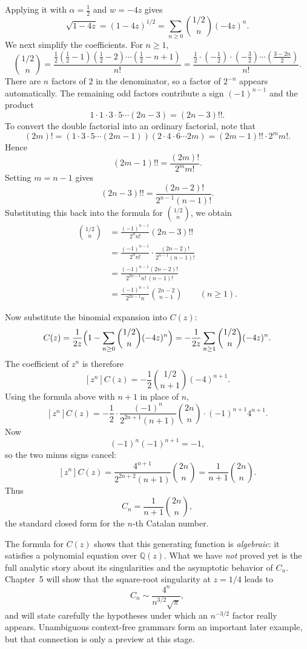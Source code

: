 Applying it with $\alpha=\tfrac12$ and $w=-4z$ gives
\[
  \sqrt{1-4z} = (1-4z)^{1/2} = \sum_{n \ge 0} \binom{1/2}{n}(-4z)^n.
\]
We next simplify the coefficients. For $n \ge 1$,
\[
  \binom{1/2}{n}
  = \frac{\tfrac12(\tfrac12-1)(\tfrac12-2)\cdots(\tfrac12-n+1)}{n!}
  = \frac{\tfrac12 \cdot (-\tfrac12)\cdot(-\tfrac32)\cdots(\tfrac{3-2n}{2})}{n!}.
\]
There are $n$ factors of $2$ in the denominator, so a factor of $2^{-n}$ appears automatically. The remaining odd factors contribute a sign $(-1)^{n-1}$ and the product
\[
  1 \cdot 1 \cdot 3 \cdot 5 \cdots (2n-3) = (2n-3)!!.
\]
To convert the double factorial into an ordinary factorial, note that
\[
  (2m)! = (1 \cdot 3 \cdot 5 \cdots (2m-1))(2 \cdot 4 \cdot 6 \cdots 2m)
  = (2m-1)!! \cdot 2^m m!.
\]
Hence
\[
  (2m-1)!! = \frac{(2m)!}{2^m m!}.
\]
Setting $m=n-1$ gives
\[
  (2n-3)!! = \frac{(2n-2)!}{2^{n-1}(n-1)!}.
\]
Substituting this back into the formula for $\binom{1/2}{n}$, we obtain
\begin{align*}
  \binom{1/2}{n}
  &= \frac{(-1)^{n-1}}{2^n n!}(2n-3)!! \\
  &= \frac{(-1)^{n-1}}{2^n n!}\cdot \frac{(2n-2)!}{2^{n-1}(n-1)!} \\
  &= \frac{(-1)^{n-1}(2n-2)!}{2^{2n-1} n! \, (n-1)!} \\
  &= \frac{(-1)^{n-1}}{2^{2n-1}n}\binom{2n-2}{n-1}
  \qquad (n \ge 1).
\end{align*}

Now substitute the binomial expansion into $C(z)$:
\[
  C(z)
  = \frac{1}{2z}\Bigl(1-\sum_{n \ge 0}\binom{1/2}{n}(-4z)^n\Bigr)
  = -\frac{1}{2z}\sum_{n \ge 1}\binom{1/2}{n}(-4z)^n.
\]
The coefficient of $z^n$ is therefore
\[
  [z^n]C(z) = -\frac12 \binom{1/2}{n+1}(-4)^{n+1}.
\]
Using the formula above with $n+1$ in place of $n$,
\[
  [z^n]C(z)
  = -\frac12 \cdot \frac{(-1)^n}{2^{2n+1}(n+1)}\binom{2n}{n} \cdot (-1)^{n+1}4^{n+1}.
\]
Now
\[
  (-1)^n(-1)^{n+1} = -1,
\]
so the two minus signs cancel:
\[
  [z^n]C(z)
  = \frac{4^{n+1}}{2^{2n+2}(n+1)}\binom{2n}{n}
  = \frac{1}{n+1}\binom{2n}{n}.
\]
Thus
\[
  C_n = \frac{1}{n+1}\binom{2n}{n},
\]
the standard closed form for the $n$-th Catalan number.

\begin{remark}
The formula for $C(z)$ shows that this generating function is \emph{algebraic}: it satisfies a polynomial equation over $\mathbb{Q}(z)$. What we have \emph{not} proved yet is the full analytic story about its singularities and the asymptotic behavior of $C_n$. Chapter~5 will show that the square-root singularity at $z=1/4$ leads to
\[
  C_n \sim \frac{4^n}{n^{3/2}\sqrt{\pi}},
\]
and will state carefully the hypotheses under which an $n^{-3/2}$ factor really appears. Unambiguous context-free grammars form an important later example, but that connection is only a preview at this stage.
\end{remark}

